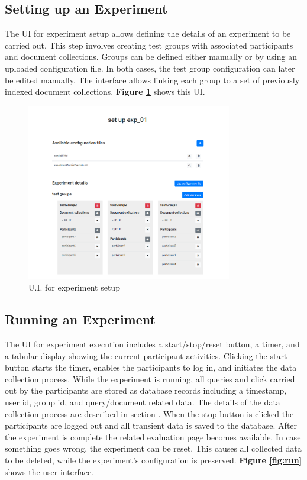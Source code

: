 \documentclass[a4paper]{usiinfbachelorproject}
\begin{document}
\subsection{Setting up an Experiment} \label{sec:designExpSetup}


The UI for experiment setup allows defining the details of an experiment to be carried out. This step involves creating
test groups with associated participants and document collections. Groups can be defined either manually or by using 
an uploaded configuration file. In both cases, the test group configuration can later be edited manually. 
The interface allows linking each group to a set of previously indexed document collections. 
\textbf{Figure \ref{fig:setup}} shows this UI.

\begin{figure} [h]
\centering
\includegraphics[width=0.8\textwidth]{figures/setup}
\caption{U.I. for experiment setup}
\label{fig:setup}
\end{figure}


\subsection{Running an Experiment} \label{sec:designExpRun}

The UI for experiment execution includes a start/stop/reset button, a timer, and a tabular display 
showing the current participant activities. Clicking the start button starts the timer, enables the participants to log in, and
initiates the data collection process. While the experiment is running, all queries and click carried out by the
participants are stored as database records including a timestamp, user id, group id, and query/document related data.
The details of the data collection process are described in section .
When the stop button is clicked the participants are logged out and all transient data is saved to the database.
After the experiment is complete the related evaluation page becomes available.
In case something goes wrong, the experiment can be reset. This causes all collected data to be deleted, while the
experiment's configuration is preserved.
\textbf{Figure \ref{fig:run}} shows the user interface.
\end{document}
